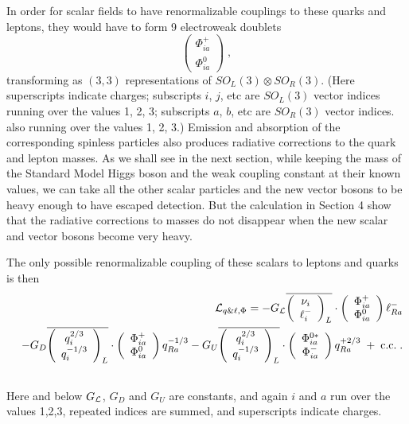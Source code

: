In order for scalar fields to have renormalizable couplings to these quarks and leptons, they would have to form 9 electroweak doublets 
\begin{equation}
\left(\begin{array}{c} \Phi_{ia}^+\\ \Phi_{ia}^0\end{array}\right)\;,
\end{equation}
transforming as $(3,3)$ representations of $SO_L(3)\otimes  SO_R(3)$.  (Here superscripts indicate charges; subscripts $i$, $j$, etc are $SO_L(3)$ vector indices running over the values 1, 2, 3; subscripts $a$, $b$, etc are $SO_R(3)$ vector indices. also running over the values 1, 2, 3.)    Emission and absorption of the corresponding spinless particles also produces radiative corrections to the quark and lepton masses.  As we shall see in the next section, while keeping the mass of the Standard Model Higgs boson and the weak coupling constant at their known values, we can take all the other scalar particles and the new vector bosons to be  heavy enough to have escaped detection.  But the calculation in Section 4 show that the radiative corrections to masses do not disappear when the new scalar and vector bosons become very heavy.
  

The only possible renormalizable coupling of these scalars to leptons and quarks is then
\begin{eqnarray}
&&{\cal L}_{q\&\ell,\Phi}=-G_{\cal L}\overline{\left(\begin{array}{c}\nu_i\\ \ell^-_i\end{array}\right)_L}\cdot \left(\begin{array}{c}\Phi^+_{ia}\\\Phi^0_{ia}\end{array}\right)\ell^-_{Ra}\nonumber\\&&-G_D\overline{\left(\begin{array}{c}q^{2/3}_i\\ q^{-1/3}_i\end{array}\right)_L}\cdot \left(\begin{array}{c}\Phi^+_{ia}\\\Phi^0_{ia}\end{array}\right)q^{-1/3}_{Ra}
-G_U\overline{\left(\begin{array}{c}q^{2/3}_i\\ q^{-1/3}_i\end{array}\right)_L}\cdot \left(\begin{array}{c}\Phi^{0*}_{ia}\\\Phi^-_{ia}\end{array}\right)q^{+2/3}_{Ra}
\;+\;{\rm c.c.} \;.\nonumber\\&&{}
\end{eqnarray}
Here and below $G_{\cal L}$, $G_D$ and $G_U$ are  constants, and again $i$ and $a$ run over the values 1,2,3,  repeated indices are summed, and superscripts indicate charges. 



